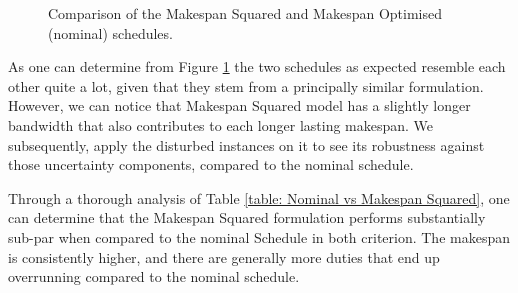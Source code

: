 \begin{figure}%
    \centering
    \qquad
    \centering
    \caption{Comparison of the Makespan Squared and Makespan Optimised (nominal) schedules.}
    \label{fig: Nominal vs Squared.}
\end{figure}


\vspace{\baselineskip}
\noindent
As one can determine from Figure \ref{fig: Nominal vs Squared.} the two schedules as expected resemble each other quite a lot, given that they stem from a principally similar formulation. However, we can notice that Makespan Squared model has a slightly longer bandwidth that also contributes to each longer lasting makespan. We subsequently, apply the disturbed instances on it to see its robustness against those uncertainty components, compared to the nominal schedule.

\vspace{\baselineskip}
\noindent
Through a thorough analysis of Table \ref{table: Nominal vs Makespan Squared}, one can determine that the Makespan Squared formulation performs substantially sub-par when compared to the nominal Schedule in both criterion. The makespan is consistently higher, and there are generally more duties that end up overrunning compared to the nominal schedule.


